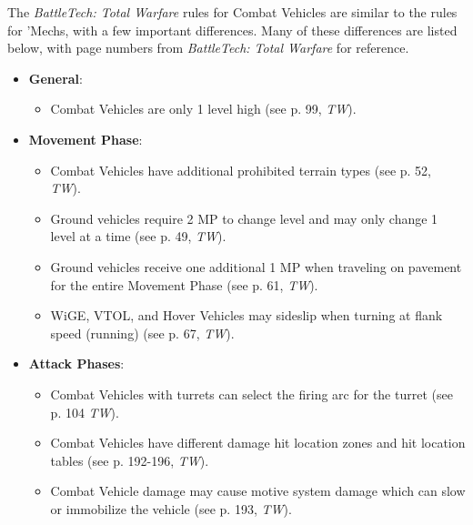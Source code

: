 The \emph{BattleTech: Total Warfare} rules for Combat Vehicles are similar to the rules for 'Mechs, with a few important differences.
Many of these differences are listed below, with page numbers from \emph{BattleTech: Total Warfare} for reference.

\begin{itemize}

  \item {\bfseries General}:

  \begin{itemize}

    \item Combat Vehicles are only 1 level high (see p. 99, \emph{TW}).

  \end{itemize}

  \item {\bfseries Movement Phase}:

  \begin{itemize}

    \item Combat Vehicles have additional prohibited terrain types (see p. 52, \emph{TW}).

    \item Ground vehicles require 2 MP to change level and may only change 1 level at a time (see p. 49, \emph{TW}).

    \item Ground vehicles receive one additional 1 MP when traveling on pavement for the entire Movement Phase (see p. 61, \emph{TW}).

    \item WiGE, VTOL, and Hover Vehicles may sideslip when turning at flank speed (running) (see p. 67, \emph{TW}).

  \end{itemize}

  \item {\bfseries Attack Phases}:

  \begin{itemize}

    \item Combat Vehicles with turrets can select the firing arc for the turret (see p. 104 \emph{TW}).

    \item Combat Vehicles have different damage hit location zones and hit location tables (see p. 192-196, \emph{TW}).

    \item Combat Vehicle damage may cause motive system damage which can slow or immobilize the vehicle (see p. 193, \emph{TW}).


\end{itemize}
\end{itemize}
